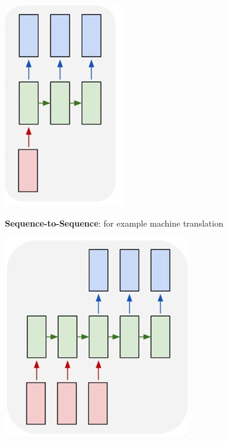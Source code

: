 \documentclass[10pt]{report}
\begin{document}
\begin{multicols}{2}
\begin{list}{}{}
\begin{center}
		\includegraphics[scale=0.5]{88.png}
	\end{center}
	\item \textbf{Sequence-to-Sequence}: for example machine translation
	\begin{center}
		\includegraphics[scale=0.5]{89.png}
	\end{center}
\end{list}
\end{multicols}
\end{document}

